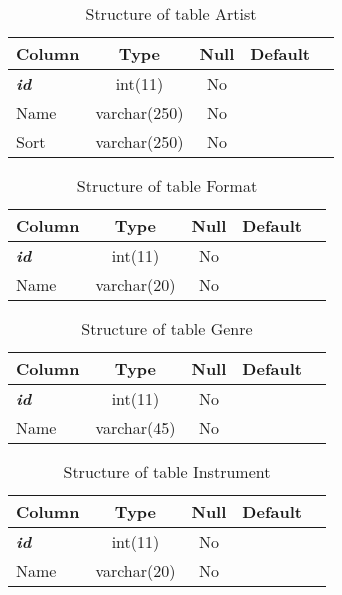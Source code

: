 %
%
 \begin{longtable}{|l|c|c|c|l|} 
 \caption{Structure of table Artist} \label{tab:Artist-structure} \\
 \hline \multicolumn{1}{|c|}{\textbf{Column}} & \multicolumn{1}{|c|}{\textbf{Type}} & \multicolumn{1}{|c|}{\textbf{Null}} & \multicolumn{1}{|c|}{\textbf{Default}} \\ \hline \hline
\textbf{\textit{id}} & int(11) & No &  \\ \hline 
Name & varchar(250) & No &  \\ \hline 
Sort & varchar(250) & No &  \\ \hline 
 \end{longtable}

%
%
 \begin{longtable}{|l|c|c|c|l|} 
 \caption{Structure of table Format} \label{tab:Format-structure} \\
 \hline \multicolumn{1}{|c|}{\textbf{Column}} & \multicolumn{1}{|c|}{\textbf{Type}} & \multicolumn{1}{|c|}{\textbf{Null}} & \multicolumn{1}{|c|}{\textbf{Default}} \\ \hline \hline
\textbf{\textit{id}} & int(11) & No &  \\ \hline 
Name & varchar(20) & No &  \\ \hline 
 \end{longtable}

%
%
 \begin{longtable}{|l|c|c|c|l|} 
 \caption{Structure of table Genre} \label{tab:Genre-structure} \\
 \hline \multicolumn{1}{|c|}{\textbf{Column}} & \multicolumn{1}{|c|}{\textbf{Type}} & \multicolumn{1}{|c|}{\textbf{Null}} & \multicolumn{1}{|c|}{\textbf{Default}} \\ \hline \hline
\textbf{\textit{id}} & int(11) & No &  \\ \hline 
Name & varchar(45) & No &  \\ \hline 
 \end{longtable}

%
%
 \begin{longtable}{|l|c|c|c|l|} 
 \caption{Structure of table Instrument} \label{tab:Instrument-structure} \\
 \hline \multicolumn{1}{|c|}{\textbf{Column}} & \multicolumn{1}{|c|}{\textbf{Type}} & \multicolumn{1}{|c|}{\textbf{Null}} & \multicolumn{1}{|c|}{\textbf{Default}} \\ \hline \hline
\textbf{\textit{id}} & int(11) & No &  \\ \hline 
Name & varchar(20) & No &  \\ \hline 
 \end{longtable}

